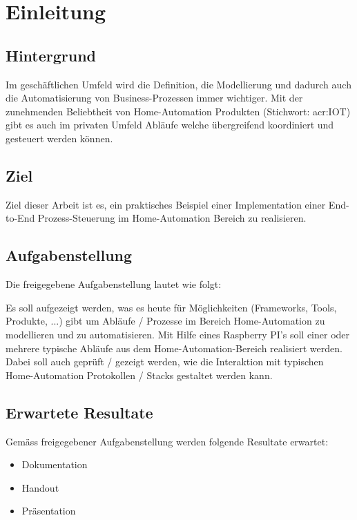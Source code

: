 
\chapter{Einleitung}

\section{Hintergrund}
Im geschäftlichen Umfeld wird die Definition, die Modellierung und dadurch auch die Automatisierung von Business-Prozessen immer wichtiger. Mit der zunehmenden Beliebtheit von Home-Automation Produkten (Stichwort: \gls{acr:IOT}) gibt es auch im privaten Umfeld Abläufe welche übergreifend koordiniert und gesteuert werden können.

\section{Ziel}
Ziel dieser Arbeit ist es, ein praktisches Beispiel einer Implementation einer
End-to-End Prozess-Steuerung im Home-Automation Bereich zu realisieren.

\section{Aufgabenstellung} \label{sec:Aufgabenstellung}
Die freigegebene Aufgabenstellung lautet wie folgt:

Es soll aufgezeigt werden, was es heute für Möglichkeiten (Frameworks, Tools,
Produkte, ...) gibt um Abläufe / Prozesse im Bereich Home-Automation zu
modellieren und zu automatisieren. Mit Hilfe eines Raspberry PI's soll einer oder
mehrere typische Abläufe aus dem Home-Automation-Bereich realisiert werden.
Dabei soll auch geprüft / gezeigt werden, wie die Interaktion mit typischen
Home-Automation Protokollen / Stacks gestaltet werden kann.


\section{Erwartete Resultate} \label{sec:ErwarteteResultate}
Gemäss freigegebener Aufgabenstellung werden folgende Resultate erwartet:

\begin{itemize}
\item Dokumentation
\item Handout
\item Präsentation
\end{itemize}


